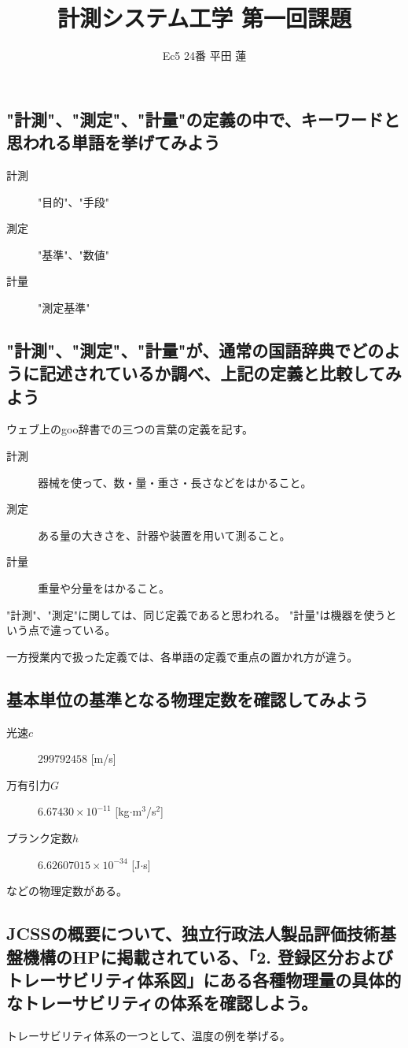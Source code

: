 \documentclass{jsarticle}
\title{計測システム工学 第一回課題}
\author{Ec5 24番 平田 蓮}
\date{}
\begin{document}
\maketitle
\subsection*{"計測"、"測定"、"計量"の定義の中で、キーワードと思われる単語を挙げてみよう}
    \begin{description}
        \item[計測] "目的"、"手段"
        \item[測定] "基準"、"数値"
        \item[計量] "測定基準"  
    \end{description}

\subsection*{"計測"、"測定"、"計量"が、通常の国語辞典でどのように記述されているか調べ、上記の定義と比較してみよう}
    ウェブ上のgoo辞書\cite{goo}での三つの言葉の定義を記す。
    \begin{description}
        \item[計測] 器械を使って、数・量・重さ・長さなどをはかること。
        \item[測定] ある量の大きさを、計器や装置を用いて測ること。
        \item[計量] 重量や分量をはかること。
    \end{description}
    "計測"、"測定"に関しては、同じ定義であると思われる。
    "計量"は機器を使うという点で違っている。

    一方授業内で扱った定義では、各単語の定義で重点の置かれ方が違う。
\subsection*{基本単位の基準となる物理定数を確認してみよう}
    \begin{description}
        \item[光速$c$] $299792458$ [m/s]
        \item[万有引力$G$] $6.67430 \times 10^{-11}$ [kg$\cdot$m$^3$/s$^2$]
        \item[プランク定数$h$] $6.62607015 \times 10^{-34}$ [J$\cdot$s]
    \end{description}
    などの物理定数がある。
\subsection*{JCSSの概要について、独立行政法人製品評価技術基盤機構のHPに掲載されている、「2. 登録区分およびトレーサビリティ体系図」にある各種物理量の具体的なトレーサビリティの体系を確認しよう。}
    トレーサビリティ体系の一つとして、温度の例を挙げる。
\end{document}
